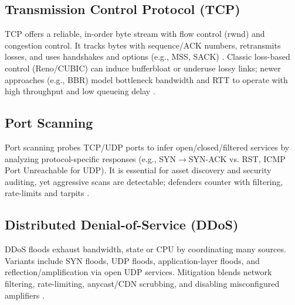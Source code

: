 \subsection{Transmission Control Protocol (TCP)}
TCP offers a reliable, in-order byte stream with flow control (rwnd) and congestion control. It tracks bytes with sequence/ACK numbers, retransmits losses, and uses handshakes and options (e.g., MSS, SACK) \cite{rfc793,kurose:topdown8e}. Classic loss-based control (Reno/CUBIC) can induce bufferbloat or underuse lossy links; newer approaches (e.g., BBR) model bottleneck bandwidth and RTT to operate with high throughput and low queueing delay \cite{cardwell2017bbr}.

\subsection{Port Scanning}
Port scanning probes TCP/UDP ports to infer open/closed/filtered services by analyzing protocol-specific responses (e.g., SYN$\rightarrow$SYN-ACK vs. RST, ICMP Port Unreachable for UDP). It is essential for asset discovery and security auditing, yet aggressive scans are detectable; defenders counter with filtering, rate-limits and tarpits \cite{lyon:nmap}.

\subsection{Distributed Denial-of-Service (DDoS)}
DDoS floods exhaust bandwidth, state or CPU by coordinating many sources. Variants include SYN floods, UDP floods, application-layer floods, and reflection/amplification via open UDP services. Mitigation blends network filtering, rate-limiting, anycast/CDN scrubbing, and disabling misconfigured amplifiers \cite{mirkovic2004taxonomy}.

%
%

